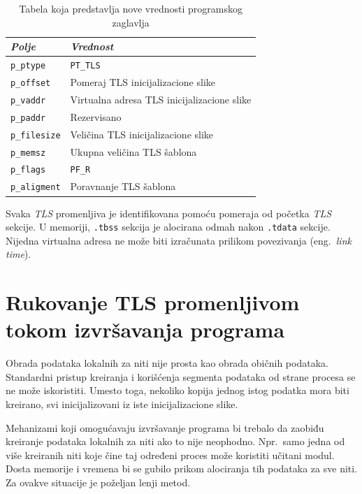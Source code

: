 \documentclass[12pt,oneside]{memoir}
\begin{document}
\begin{table}
		\begin{center}
		\begin{tabular}{ | l | l |}
			\hline
			\emph{Polje} & \emph{Vrednost} \\ \hline
			\texttt{p\_ptype} & \texttt{PT\_TLS} \\ \hline
			\texttt{p\_offset} & Pomeraj TLS inicijalizacione slike  \\ \hline
			\texttt{p\_vaddr} & Virtualna adresa TLS inicijalizacione slike  \\ \hline
			\texttt{p\_paddr} & Rezervisano  \\ \hline
			\texttt{p\_filesize} & Veličina TLS inicijalizacione slike  \\ \hline
			\texttt{p\_memsz} & Ukupna veličina TLS šablona  \\ \hline
			\texttt{p\_flags} & \texttt{PF\_R}  \\ \hline
			\texttt{p\_aligment} & Poravnanje TLS šablona  \\ \hline
		\end{tabular}
	   \end{center}
		\caption{\label{tab:tls_prheader}Tabela koja predstavlja nove vrednosti programskog zaglavlja}
\end{table}

Svaka \emph{TLS} promenljiva je identifikovana pomoću pomeraja od početka \emph{TLS} sekcije. U memoriji, \texttt{.tbss} sekcija je alocirana odmah nakon \texttt{.tdata} sekcije. Nijedna virtualna adresa ne može biti izračunata prilikom povezivanja (eng.~\emph{link time}).

\section{Rukovanje TLS promenljivom tokom izvršavanja programa}
\label{sec:izvrTls}

Obrada podataka lokalnih za niti nije prosta kao obrada običnih podataka. Standardni pristup kreiranja i korišćenja segmenta podataka od strane procesa se ne može iskoristiti. Umesto toga, nekoliko kopija jednog istog podatka mora biti kreirano, svi inicijalizovani iz iste inicijalizacione slike.

Mehanizami koji omogućavaju izvršavanje programa bi trebalo da zaobiđu kreiranje podataka lokalnih za niti ako to nije neophodno. Npr.~samo jedna od više kreiranih niti koje čine taj određeni proces
može koristiti učitani modul. Dosta memorije i vremena bi se gubilo prikom alociranja tih podataka za sve niti. Za ovakve situacije je poželjan lenji metod.
\end{document}
